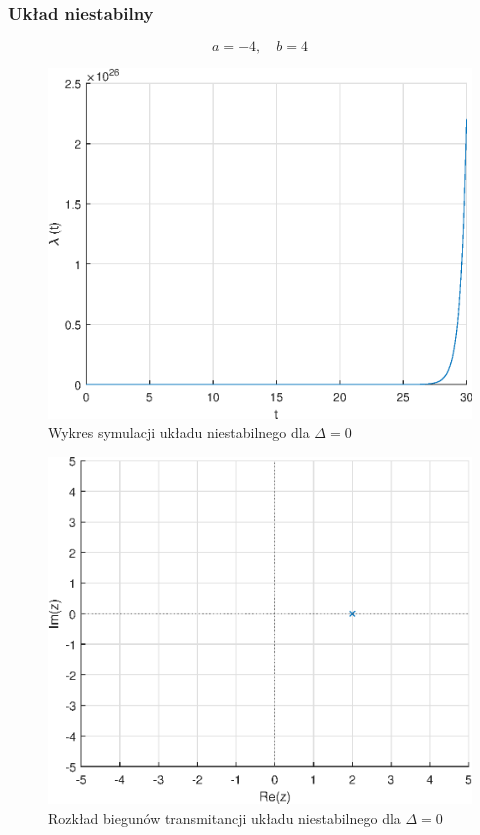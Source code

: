 \documentclass[a4paper]{article}
\begin{document}
\subsubsection{Układ niestabilny}
$$
a=-4,\quad b=4
$$
\begin{figure}[H]
    \centering
    \includegraphics[scale=0.6]{b2.eps}
    \caption{Wykres symulacji układu niestabilnego dla $\Delta=0$}
\end{figure}
\begin{figure}[H]
    \centering
    \includegraphics[scale=0.6]{b2_z.eps}
    \caption{Rozkład biegunów transmitancji układu niestabilnego dla $\Delta=0$}
\end{figure}
\end{document}

